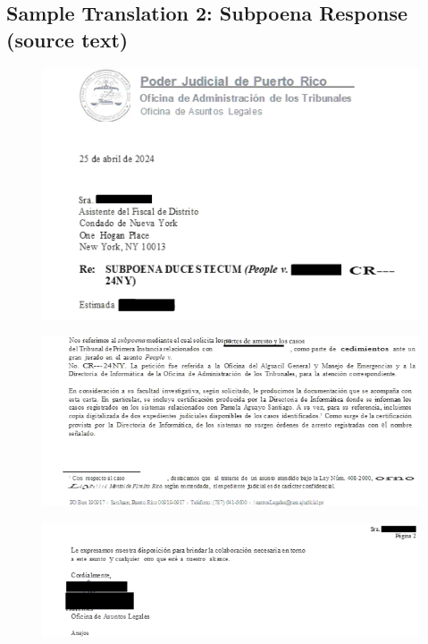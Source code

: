 \documentclass{article}
\begin{document}
\subsection{Sample Translation 2: Subpoena Response (source text)}

\begin{figure}[H]
	\centering
	\includegraphics[width=\textwidth]{../sample_translations/source_2_1.png}
\end{figure}

\begin{figure}[H]
	\centering
	\includegraphics[width=\textwidth]{../sample_translations/source_2_2.png}
\end{figure}

\begin{figure}[H]
	\centering
	\includegraphics[width=\textwidth]{../sample_translations/source_2_3.png}
\end{figure}
\end{document}
